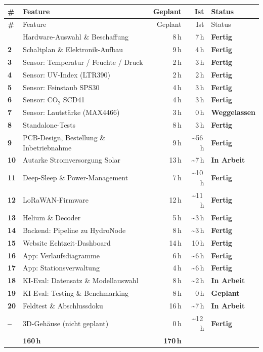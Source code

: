 \documentclass[11pt,a4paper]{scrartcl}
\newcommand{\status}[1]{%
  \ifstrequal{#1}{Fertig}{\textcolor{colgreen}{\textbf{Fertig}}}{}%
  \ifstrequal{#1}{In Arbeit}{\textcolor{colorange}{\textbf{In Arbeit}}}{}%
  \ifstrequal{#1}{Geplant}{\textcolor{colblue}{\textbf{Geplant}}}{}%
  \ifstrequal{#1}{Weggelassen}{\textcolor{colred}{\textbf{Weggelassen}}}{}%
}
\begin{document}
\begin{longtable}{>{\bfseries}p{0.5cm} p{5.5cm} r r l}
  \toprule
  \# & Feature & Geplant & Ist & Status \\
  \midrule
  \endfirsthead
  \toprule
  \# & Feature & Geplant & Ist & Status \\
  \midrule
  \endhead
  \bottomrule
  \endlastfoot
  1  & Hardware-Auswahl \& Beschaffung & 8\,h & 7\,h & \status{Fertig} \\
  \rowcolor{rowgray}
  2  & Schaltplan \& Elektronik-Aufbau & 9\,h & 4\,h & \status{Fertig} \\
  3  & Sensor: Temperatur / Feuchte / Druck & 2\,h & 3\,h & \status{Fertig} \\
  \rowcolor{rowgray}
  4  & Sensor: UV-Index (LTR390) & 2\,h & 2\,h & \status{Fertig} \\
  5  & Sensor: Feinstaub SPS30 & 4\,h & 3\,h & \status{Fertig} \\
  \rowcolor{rowgray}
  6  & Sensor: CO$_2$ SCD41 & 4\,h & 3\,h & \status{Fertig} \\
  7  & Sensor: Lautstärke (MAX4466) & 3\,h & 0\,h & \status{Weggelassen} \\
  \rowcolor{rowgray}
  8  & Standalone-Tests & 8\,h & 3\,h & \status{Fertig} \\
  9  & PCB-Design, Bestellung \& Inbetriebnahme & 9\,h & \textasciitilde56\,h & \status{Fertig} \\
  \rowcolor{rowgray}
  10 & Autarke Stromversorgung Solar & 13\,h & \textasciitilde7\,h & \status{In Arbeit} \\
  11 & Deep-Sleep \& Power-Management & 7\,h & \textasciitilde10\,h & \status{Fertig} \\
  \rowcolor{rowgray}
  12 & LoRaWAN-Firmware & 12\,h & \textasciitilde11\,h & \status{Fertig} \\
  13 & Helium \& Decoder & 5\,h & \textasciitilde3\,h & \status{Fertig} \\
  \rowcolor{rowgray}
  14 & Backend: Pipeline zu HydroNode & 8\,h & \textasciitilde3\,h & \status{Fertig} \\
  15 & Website Echtzeit-Dashboard & 14\,h & 10\,h & \status{Fertig} \\
  \rowcolor{rowgray}
  16 & App: Verlaufsdiagramme & 6\,h & \textasciitilde6\,h & \status{Fertig} \\
  17 & App: Stationsverwaltung & 4\,h & \textasciitilde6\,h & \status{Fertig} \\
  \rowcolor{rowgray}
  18 & KI-Eval: Datensatz \& Modellauswahl & 8\,h & \textasciitilde2\,h & \status{In Arbeit} \\
  19 & KI-Eval: Testing \& Benchmarking & 8\,h & 0\,h & \status{Geplant} \\
  \rowcolor{rowgray}
  20 & Feldtest \& Abschlussdoku & 16\,h & \textasciitilde7\,h & \status{In Arbeit} \\
  -- & 3D-Gehäuse (nicht geplant) & 0\,h & \textasciitilde12\,h & \status{Fertig} \\
  \midrule
  \multicolumn{2}{l}{\textbf{Gesamt}} & \textbf{160\,h} & \textbf{170\,h} & \\
\end{longtable}
\end{document}
